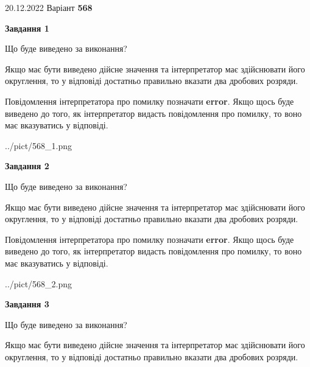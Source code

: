 \documentclass[12pt, ukrainian]{article}
\begin{document}
{20.12.2022 Варіант \No \textbf { 568 }\par}
{
\begin {Large}

{\begin {center}\textbf{Завдання 1}\end {center}}\par
Що буде виведено за виконання? \par

Якщо має бути виведено дійсне значення та інтерпретатор має здійснювати його округлення, 
то у відповіді достатньо правильно вказати два дробових розряди.

Повідомлення інтерпретатора про помилку позначати \textbf{error}.
Якщо щось буде виведено до того, як інтерпретатор видасть повідомлення про помилку, 
то воно має вказуватись у відповіді. \par

\begin{center}
	{../pict/568_1.png}
\end{center}
\newpage

{\begin {center}\textbf{Завдання 2}\end {center}}\par
Що буде виведено за виконання? \par

Якщо має бути виведено дійсне значення та інтерпретатор має здійснювати його округлення, 
то у відповіді достатньо правильно вказати два дробових розряди.

Повідомлення інтерпретатора про помилку позначати \textbf{error}.
Якщо щось буде виведено до того, як інтерпретатор видасть повідомлення про помилку, 
то воно має вказуватись у відповіді. \par

\begin{center}
	{../pict/568_2.png}
\end{center}
\newpage

{\begin {center}\textbf{Завдання 3}\end {center}}\par
Що буде виведено за виконання? \par

Якщо має бути виведено дійсне значення та інтерпретатор має здійснювати його округлення, 
то у відповіді достатньо правильно вказати два дробових розряди.


\end{Large}}
\end{document}
